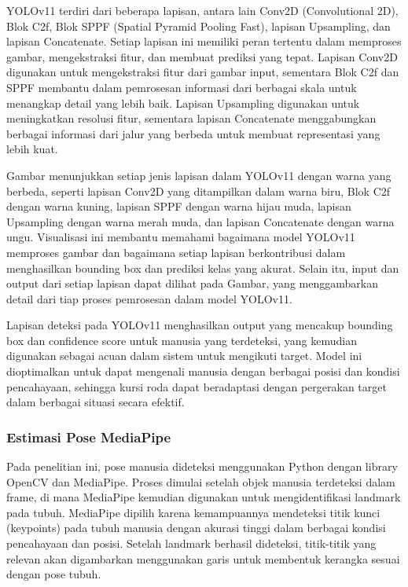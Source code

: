YOLOv11 terdiri dari beberapa lapisan, antara lain Conv2D (Convolutional 2D), Blok C2f, Blok SPPF (Spatial Pyramid Pooling Fast), lapisan Upsampling, dan lapisan Concatenate. Setiap lapisan ini memiliki peran tertentu dalam memproses gambar, mengekstraksi fitur, dan membuat prediksi yang tepat. Lapisan Conv2D digunakan untuk mengekstraksi fitur dari gambar input, sementara Blok C2f dan SPPF membantu dalam pemrosesan informasi dari berbagai skala untuk menangkap detail yang lebih baik. Lapisan Upsampling digunakan untuk meningkatkan resolusi fitur, sementara lapisan Concatenate menggabungkan berbagai informasi dari jalur yang berbeda untuk membuat representasi yang lebih kuat.

Gambar menunjukkan setiap jenis lapisan dalam YOLOv11 dengan warna yang berbeda, seperti lapisan Conv2D yang ditampilkan dalam warna biru, Blok C2f dengan warna kuning, lapisan SPPF dengan warna hijau muda, lapisan Upsampling dengan warna merah muda, dan lapisan Concatenate dengan warna ungu. Visualisasi ini membantu memahami bagaimana model YOLOv11 memproses gambar dan bagaimana setiap lapisan berkontribusi dalam menghasilkan bounding box dan prediksi kelas yang akurat. Selain itu, input dan output dari setiap lapisan dapat dilihat pada Gambar, yang menggambarkan detail dari tiap proses pemrosesan dalam model YOLOv11.

Lapisan deteksi pada YOLOv11 menghasilkan output yang mencakup bounding box dan confidence score untuk manusia yang terdeteksi, yang kemudian digunakan sebagai acuan dalam sistem untuk mengikuti target. Model ini dioptimalkan untuk dapat mengenali manusia dengan berbagai posisi dan kondisi pencahayaan, sehingga kursi roda dapat beradaptasi dengan pergerakan target dalam berbagai situasi secara efektif.

\subsubsection{Estimasi Pose MediaPipe}
\label{subsubsec:estimasi_pose_mediapipe}

Pada penelitian ini, pose manusia dideteksi menggunakan Python dengan library OpenCV dan MediaPipe. Proses dimulai setelah objek manusia terdeteksi dalam frame, di mana MediaPipe kemudian digunakan untuk mengidentifikasi landmark pada tubuh. MediaPipe dipilih karena kemampuannya mendeteksi titik kunci (keypoints) pada tubuh manusia dengan akurasi tinggi dalam berbagai kondisi pencahayaan dan posisi. Setelah landmark berhasil dideteksi, titik-titik yang relevan akan digambarkan menggunakan garis untuk membentuk kerangka sesuai dengan pose tubuh.

